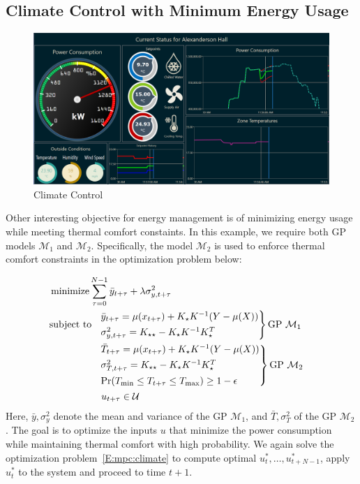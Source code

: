 \subsection{Climate Control with Minimum Energy Usage}

\begin{figure}[t]
	\includegraphics[width=\linewidth]{images/Dashboard-DR.png}
	\caption{Climate Control}
	\label{F:climate}
\end{figure}

Other interesting objective for energy management is of minimizing energy usage while meeting thermal comfort constaints. In this example, we require both GP models \(\mathcal{M}_1\) and \(\mathcal{M}_2\).
Specifically, the model \(\mathcal{M}_2\) is used to enforce thermal comfort constraints in the optimization problem below:

\begin{align}
&\operatorname*{minimize} \sum_{\tau=0}^{N-1} \bar{y}_{t+\tau} + \lambda \sigma^2_{y,t+\tau} \label{E:mpc:climate} \\
& 
\begin{aligned}
\text{subject to}\ \  & \begin{rcases}\bar{y}_{t+\tau} = \mu(x_{t+\tau}) + K_\star K^{-1} (Y - \mu(X)) \nonumber\\
\sigma^2_{y,t+\tau} = K_{\star \star} - K_\star K^{-1} K_\star^T
\end{rcases} \text{GP } \mathcal{M}_1 \\
& \begin{rcases}
 \bar{T}_{t+\tau} = \mu(x_{t+\tau}) + K_\star K^{-1} (Y - \mu(X)) \nonumber\\
\sigma^2_{T,t+\tau} = K_{\star \star} - K_\star K^{-1} K_\star^T \\
\Pr(T_{\mathrm{min}} \leq T_{t+\tau} \leq T_{\mathrm{max}}) \geq 1 - \epsilon \nonumber
\end{rcases} \text{GP } \mathcal{M}_2 \\
& \ u_{t+\tau} \in \mathcal{U} \nonumber
\end{aligned}
\end{align}
Here, \(\bar{y},\sigma^2_{y}\) denote the mean and variance of the GP \(\mathcal{M}_1\), and \(\bar{T},\sigma^2_{T}\) of the GP \(\mathcal{M}_2\). 
The goal is to optimize the inputs \(u\) that minimize the power consumption while maintaining thermal comfort with high probability. 
We again solve the optimization problem~\eqref{E:mpc:climate} to compute optimal \(u_{t}^*, \dots, u_{t+N-1}^*\), apply \(u_{t}^*\) to the system and proceed to time \(t+1\).

